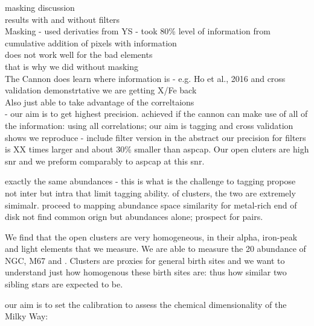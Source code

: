 \documentclass[14pt, preprint2]{aastex6}
\newcommand{\project}[1]{\textsl{#1}}
\newcommand{\tc}{\project{The~Cannon}}
\newcommand{\apogee}{\project{\textsc{apogee}}}
\begin{document}
masking discussion \\
results with and without filters\\
Masking - used derivaties from YS - took 80\% level of information from cumulative addition of pixels with information \\
does not work well for the bad elements \\
that is why we did without masking \\
The Cannon does learn where information is - e.g. Ho et al., 2016 and cross validation demonstrtative we are getting X/Fe back \\
Also just able to take advantage of the correltaions \\
- our aim is to get highest precision. achieved if the cannon can make use of all of the information: using all correlations; our aim is tagging and cross validation shows we reproduce - include filter version in the abstract
our precision for filters is XX times larger and about 30\% smaller than aspcap. Our open cluters are high snr and we preform comparably to aspcap at this snr. 


 exactly the same abundances - this is what is the challenge to tagging 
propose not inter but intra that limit tagging ability.
of clusters, the two are extremely simimalr. 
proceed to mapping abundance space similarity for metal-rich end of disk not find common orign but abundances alone; prospect for pairs. 

We find that the open clusters are very homogeneous, in their alpha, iron-peak and light elements that we measure. We are able to measure the 20 abundance of NGC, M67 and . Clusters are proxies for general birth sites and we want to understand just how homogenous these birth sites are: thus how similar two sibling stars are expected to be. 

 our aim is to set the calibration to assess the chemical dimensionality of the Milky Way:

\end{document}
